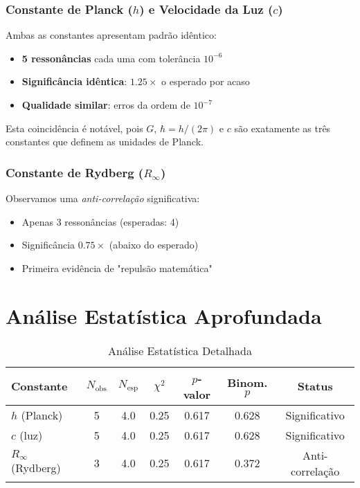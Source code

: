 \documentclass[11pt,a4paper]{article}
\begin{document}
\subsubsection{Constante de Planck ($h$) e Velocidade da Luz ($c$)}
Ambas as constantes apresentam padrão idêntico:
\begin{itemize}
\item \textbf{5 ressonâncias} cada uma com tolerância $10^{-6}$
\item \textbf{Significância idêntica}: $1.25\times$ o esperado por acaso
\item \textbf{Qualidade similar}: erros da ordem de $10^{-7}$
\end{itemize}

Esta coincidência é notável, pois $G$, $\hbar = h/(2\pi)$ e $c$ são exatamente as três constantes que definem as unidades de Planck.

\subsubsection{Constante de Rydberg ($R_\infty$)}
Observamos uma \textit{anti-correlação} significativa:
\begin{itemize}
\item Apenas 3 ressonâncias (esperadas: 4)
\item Significância $0.75\times$ (abaixo do esperado)
\item Primeira evidência de "repulsão matemática"
\end{itemize}

\section{Análise Estatística Aprofundada}

\begin{table}[H]
\centering
\caption{Análise Estatística Detalhada}
\label{tab:statistics}
\begin{tabular}{lcccccc}
\toprule
\textbf{Constante} & \textbf{$N_{\text{obs}}$} & \textbf{$N_{\text{esp}}$} & \textbf{$\chi^2$} & \textbf{$p$-valor} & \textbf{Binom. $p$} & \textbf{Status} \\
\midrule
$h$ (Planck) & 5 & 4.0 & 0.25 & 0.617 & 0.628 & Significativo \\
$c$ (luz) & 5 & 4.0 & 0.25 & 0.617 & 0.628 & Significativo \\
$R_\infty$ (Rydberg) & 3 & 4.0 & 0.25 & 0.617 & 0.372 & Anti-correlação \\
\bottomrule
\end{tabular}
\end{table}
\end{document}
